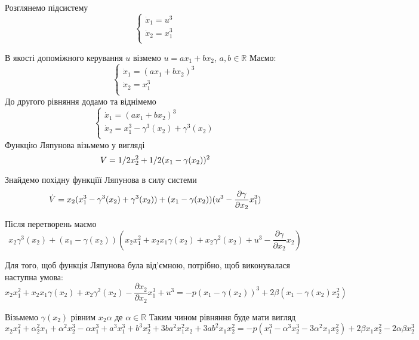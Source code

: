 \documentclass{article}
\begin{document}
Розглянемо підсистему
\begin{equation}
    \begin{cases}
    \dot x_1 = u^3\\
    \dot x_2 = x_{1}^3\\
    \end{cases}
\end{equation}

В якості допоміжного керування $u$ візмемо $u=ax_1+bx_2$, $a,b \in \mathbb{R}$
Маємо: 
\begin{equation}
    \begin{cases}
    \dot x_1 = (ax_1+bx_2)^3\\
    \dot x_2 = x_{1}^3\\
    \end{cases}
\end{equation}
До другого рівняння додамо та віднімемо 
\begin{equation}
    \begin{cases}
    \dot x_1 = (ax_1+bx_2)^3\\
    \dot x_2 = x_{1}^3 -\gamma^3(x_2)+\gamma^3(x_2)\\
    \end{cases}
\end{equation}
Функцію Ляпунова візьмемо у вигляді  
\begin{equation}
    V = 1/2x_{2}^2 + 1/2(x_1 - \gamma(x_2) )^2\\
\end{equation}

Знайдемо похідну функціїї Ляпунова в силу системи 
\begin{equation}
    \dot V = x_2(x_1^3 - \gamma^3(x_2)+\gamma^3(x_2)) + \\
    (x_1 - \gamma(x_2))(u^3-\frac{\partial \gamma}{\partial x_2}x_1^3)
\end{equation}

Після перетворень маємо
\begin{equation}
    x_2\gamma^3(x_2)+(x_1 - \gamma(x_2))
    (x_2x_1^2+x_2x_1\gamma(x_2)+x_2\gamma^2(x_2)+u^3- 
    \frac{\partial \gamma}{\partial x_2}x_2)
\end{equation}

Для того, щоб функція Ляпунова була від'ємною, потрібно, щоб
виконувалася наступна умова:
\begin{equation}
    x_2x_1^2+x_2x_1\gamma(x_2) + x_2 \gamma^2(x_2) - 
    \frac{\partial x_2}{\partial x_2}x_1^3 + u^3 = 
    -p(x_1-\gamma(x_2))^3 +2\beta(x_1-\gamma(x_2)x_{2}^2) 
\end{equation}

Візьмемо $\gamma(x_2)$ рівним $x_2\alpha$ де $\alpha \in \mathbb{R}$
Таким чином рівняння буде мати вигляд
\begin{equation}
x_2x_{1}^2 + \alpha_{2}^2x_1 + \alpha^2x_2^3-\alpha x_{1}^3 +
a^3x_{1}^3 + b^3x_{2}^3+ 
3ba^2x_{1}^2x_2+3ab^2x_1x_{2}^2 = 
-p(x_1^3 - \alpha^{3}x_{2}^3 - 3\alpha^{2}x_1x_{2}^2)+
2\beta x_1x_{2}^2 - 2\alpha \beta x_2^3
\end{equation}
\end{document}

